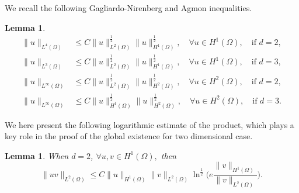 \documentclass[11pt]{article}
\newtheorem{lemma}[theorem]{Lemma}
\numberwithin{equation}{section}
\begin{document}
We  recall the following Gagliardo-Nirenberg and Agmon inequalities.
\begin{lemma}\label{chazhi}\cite{Temam}
\begin{align}
\|u\|_{L^4(\Omega)} &\leq C \|u\|_{L^2(\Omega)}^{\frac{1}{2}} \|u\|_{H^1(\Omega)}^{\frac{1}{2}}, \quad \forall u \in H^1(\Omega), \quad \text{if } d = 2, \label{eq:3.3} \\
\|u\|_{L^3(\Omega)} &\leq C \|u\|_{L^2(\Omega)}^{\frac{1}{2}} \|u\|_{H^1(\Omega)}^{\frac{1}{2}}, \quad \forall u \in H^1(\Omega), \quad \text{if } d = 3, \label{eq:3.4} \\
\|u\|_{L^\infty(\Omega)} &\leq C \|u\|_{L^2(\Omega)}^{\frac{1}{2}} \|u\|_{H^2(\Omega)}^{\frac{1}{2}}, \quad \forall u \in H^2(\Omega), \quad \text{if } d = 2, \label{eq:3.5} \\
\|u\|_{L^\infty(\Omega)} &\leq C \|u\|_{H^1(\Omega)}^{\frac{1}{2}} \|u\|_{H^2(\Omega)}^{\frac{1}{2}}, \quad \forall u \in H^2(\Omega), \quad \text{if } d = 3. \label{eq:3.6}
\end{align}
\end{lemma}
We here  present  the following logarithmic estimate of the product, which plays a key role in the proof of the global existence for two dimensional case.
\begin{lemma}\label{log}\cite{AAR} When $d=2$, $\forall u, v \in H^1(\Omega),$ then
\begin{equation}\label{eq:3.7}
\|uv\|_{L^2(\Omega)} \leq C \|u\|_{H^1(\Omega)} \|v\|_{L^2(\Omega)} \ln^{\frac{1}{2}} \Big( e \frac{\|v\|_{H^1(\Omega)}}{\|v\|_{L^2(\Omega)}} \Big).
\end{equation}
\end{lemma}
\end{document}
